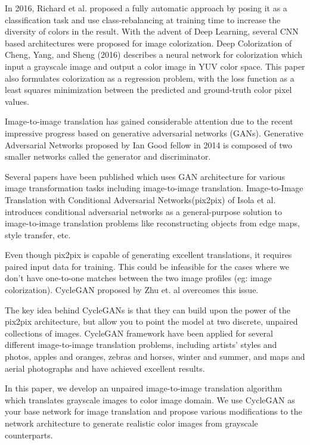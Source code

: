 \documentclass{article} %
\begin{document}
In 2016, Richard et al. \cite{richard} proposed a fully automatic approach by posing it as a classification task and use class-rebalancing at training time to increase the diversity of colors in the result. With the advent of Deep Learning, several CNN based architectures were proposed for image colorization. Deep Colorization \cite{deepcolor} of Cheng, Yang, and Sheng (2016) describes a neural network for colorization which input a grayscale image and output a color image in YUV color space. This paper also formulates colorization as a regression problem, with the loss function as a least squares minimization between the predicted and ground-truth color pixel values.

Image-to-image translation\cite{pix2pix} has gained considerable attention due to the recent impressive progress based on generative adversarial networks (GANs).  Generative Adversarial Networks \cite{gan} proposed by Ian Good fellow in 2014 is composed of two smaller networks called the generator and discriminator. 

Several papers have been published which uses GAN architecture for various image transformation tasks including image-to-image translation. Image-to-Image Translation with Conditional Adversarial Networks(pix2pix) of Isola et al.\cite{pix2pix} introduces conditional adversarial networks as a general-purpose solution to image-to-image translation problems like reconstructing objects from edge maps, style transfer, etc. 

Even though pix2pix is capable of generating excellent translations, it requires paired input data for training. This could be infeasible for the cases where we don't have one-to-one matches between the two image profiles (eg: image colorization). CycleGAN \cite{cyclegan} proposed by Zhu et. al overcomes this issue.

The key idea behind CycleGANs\cite{cyclegan} is that they can build upon the power of the pix2pix\cite{pix2pix} architecture, but allow you to point the model at two discrete, unpaired collections of images. CycleGAN framework have been applied for several different image-to-image translation problems, including artists’ styles and photos, apples and oranges, zebras and horses, winter and summer, and maps and aerial photographs and have achieved excellent results\cite{cyclegan_site}. 

In this paper, we develop an unpaired image-to-image translation algorithm which translates grayscale images to color image domain. We use CycleGAN as your base network for image translation and propose various modifications  to the network architecture to generate realistic color images from grayscale counterparts.
\end{document}
